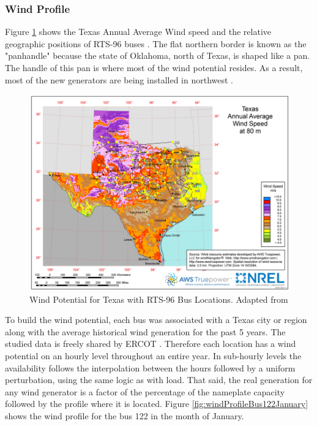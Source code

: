 \documentclass[12pt,LUDisStyle,twosided]{book}
\begin{document}
\newpage
\subsubsection{Wind Profile}


Figure \ref{fig:texasWindProfile} shows the Texas Annual Average Wind speed and the relative geographic positions of RTS-96 buses \cite{wongieee}. The flat northern border is known as the "panhandle" because the state of Oklahoma, north of Texas, is shaped like a pan. The handle of this pan is where most of the wind potential resides. As a result, most of the new generators are being installed in northwest \cite{texasWindProfile}.

\begin{figure}[H] 
  \includegraphics[width=\textwidth,keepaspectratio]{texasWindProfileWithBuses.png}
  \caption{Wind Potential for Texas with RTS-96 Bus Locations. Adapted from \cite{texasWindProfile} }
  \label{fig:texasWindProfile}
\end{figure}


To build the wind potential, each bus was associated with a Texas city or region along with the average historical wind generation for the past 5 years. The studied data is freely shared by ERCOT \cite{ercotGenerationWind}. Therefore each location has a wind potential on an hourly level throughout an entire year. In sub-hourly levels the availability follows the interpolation between the hours followed by a uniform perturbation, using the same logic as with load. That said, the real generation for any wind generator is a factor of the percentage of the nameplate capacity followed by the profile where it is located. Figure \ref{fig:windProfileBus122January} shows the wind profile for the bus 122 in the month of January.
\end{document}
